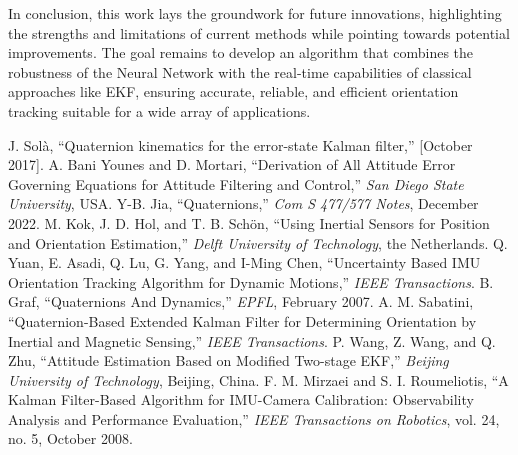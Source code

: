 \documentclass[conference]{IEEEtran}
\begin{document}
In conclusion, this work lays the groundwork for future innovations, highlighting the strengths and limitations of current methods while pointing towards potential improvements. The goal remains to develop an algorithm that combines the robustness of the Neural Network with the real-time capabilities of classical approaches like EKF, ensuring accurate, reliable, and efficient orientation tracking suitable for a wide array of applications.

\clearpage

\begin{thebibliography}{00}
 J. Solà, ``Quaternion kinematics for the error-state Kalman filter,'' [October 2017].
 A. Bani Younes and D. Mortari, ``Derivation of All Attitude Error Governing Equations for Attitude Filtering and Control,'' \textit{San Diego State University}, USA.
 Y-B. Jia, ``Quaternions,'' \textit{Com S 477/577 Notes}, December 2022.
 M. Kok, J. D. Hol, and T. B. Schön, ``Using Inertial Sensors for Position and Orientation Estimation,'' \textit{Delft University of Technology}, the Netherlands.
 Q. Yuan, E. Asadi, Q. Lu, G. Yang, and I-Ming Chen, ``Uncertainty Based IMU Orientation Tracking Algorithm for Dynamic Motions,'' \textit{IEEE Transactions}.
 B. Graf, ``Quaternions And Dynamics,'' \textit{EPFL}, February 2007.
 A. M. Sabatini, ``Quaternion-Based Extended Kalman Filter for Determining Orientation by Inertial and Magnetic Sensing,'' \textit{IEEE Transactions}.
 P. Wang, Z. Wang, and Q. Zhu, ``Attitude Estimation Based on Modified Two-stage EKF,'' \textit{Beijing University of Technology}, Beijing, China.
 F. M. Mirzaei and S. I. Roumeliotis, ``A Kalman Filter-Based Algorithm for IMU-Camera Calibration: Observability Analysis and Performance Evaluation,'' \textit{IEEE Transactions on Robotics}, vol. 24, no. 5, October 2008.
\end{thebibliography}
\vspace{12pt}
\end{document}
